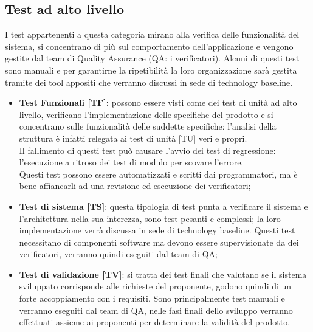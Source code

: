 \documentclass[PianoDiProgetto.tex]{subfiles}
\begin{document}
\subsection{Test ad alto livello}
I test appartenenti a questa categoria mirano alla verifica delle funzionalità del sistema, si concentrano di più sul comportamento dell'applicazione e vengono gestite dal team di Quality Assurance (QA: i verificatori).
Alcuni di questi test sono manuali e per garantirne la ripetibilità la loro organizzazione sarà gestita tramite dei tool appositi che verranno discussi in sede di technology baseline.
\begin{itemize}
	\item \textbf{Test Funzionali [TF]:} possono essere visti come dei test di unità ad alto livello, verificano l'implementazione delle specifiche del prodotto e si concentrano sulle funzionalità delle suddette specifiche: l'analisi della struttura è infatti relegata ai test di unità [TU] veri e propri. \\
	Il fallimento di questi test può causare l'avvio dei test di regressione: l'esecuzione a ritroso dei test di modulo per scovare l'errore.\\
	Questi test possono essere automatizzati e scritti dai programmatori, ma è bene affiancarli ad una revisione ed esecuzione dei verificatori;
	\item \textbf{Test di sistema [TS]}: questa tipologia di test punta a verificare il sistema e l'architettura nella sua interezza, sono test pesanti e complessi; la loro implementazione verrà discussa in sede di technology baseline. 
	Questi test necessitano di componenti software ma devono essere supervisionate da dei verificatori, verranno quindi eseguiti dal team di QA;
	\item \textbf{Test di validazione [TV]}: si tratta dei test finali che valutano se il sistema sviluppato corrisponde alle richieste del proponente, godono quindi di un forte accoppiamento con i requisiti. Sono principalmente test manuali e verranno eseguiti dal team di QA, nelle fasi finali dello sviluppo verranno effettuati assieme ai proponenti per determinare la validità del prodotto.

\end{itemize}	
	
\end{document}
